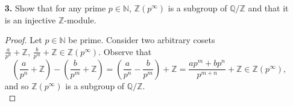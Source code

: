 \documentclass[ 12pt ]{article}
\begin{document}
\begin{enumerate}
\begin{proof}
			Conversely, if every $R$-module is injective, we also obtain the same condition that every short exact sequence is split exact and by the same argument, we can see that every injective $R$-module is projective. \\

			To illustrate that a ring exhibits the above equivalent conditions, consider a field $\mathbb{F}$ (for concreteness, we may arbitrarily take $\mathbb{F} = \mathbb{R}$). We know that any vector space over $\mathbb{F}$ will have a nonempty basis and so it is a free $\mathbb{F}$-module. Thus, all $\mathbb{F}$-modules are projective.
		\end{proof}



	\item[\textbf{3.}] Show that for any prime $p \in \mathbb{N}$, $\mathbb{Z}(p^\infty)$ is a subgroup of $\mathbb{Q}/\mathbb{Z}$ and that it is an injective $\mathbb{Z}$-module.

		\begin{proof}
			Let $p \in \mathbb{N}$ be prime. Consider two arbitrary cosets $\frac{a}{p^n} + \mathbb{Z},\, \frac{b}{p^m} + \mathbb{Z} \in \mathbb{Z}(p^\infty)$. Observe that $$\left ( \frac{a}{p^n} + \mathbb{Z} \right ) - \left ( \frac{b}{p^m} + \mathbb{Z} \right ) = \left ( \frac{a}{p^n} - \frac{b}{p^m} \right ) + \mathbb{Z} = \frac{ap^m + bp^n}{p^{m+n}} + \mathbb{Z} \in \mathbb{Z}(p^\infty),$$ and so $\mathbb{Z}(p^\infty)$ is a subgroup of $\mathbb{Q}/\mathbb{Z}$. \\


\end{proof}
\end{enumerate}
\end{document}
